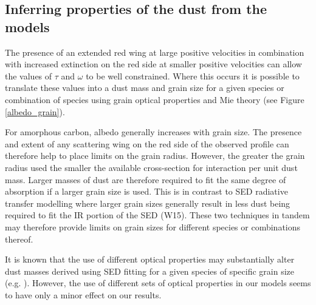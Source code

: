 \documentclass[useAMS,usenatbib,usegraphicx]{mnras}
\begin{document}
\subsection{Inferring properties of the dust from the models}





The presence of an extended red wing at large positive velocities in 
combination with increased extinction on the red side at smaller positive 
velocities can allow the values of $\tau$ and $\omega$ to be well 
constrained.  Where this occurs it is possible to translate these values into a 
dust mass and grain size for a given species or combination of 
species using grain optical properties and Mie theory (see Figure 
\ref{albedo_grain}).  


For amorphous carbon, albedo generally increases with grain size.  The presence and extent of any scattering wing on the red side of the observed profile can therefore help to place limits on the grain radius.  However, the greater the grain radius used the smaller the available cross-section for interaction per unit dust mass.  Larger masses of dust 
are therefore required to fit the same degree of absorption if a larger 
grain size is used.  This is in contrast to SED radiative transfer 
modelling where larger grain sizes generally result in less dust being 
required to fit the IR portion of the SED (W15).  These two techniques in 
tandem may therefore provide limits on grain sizes for different 
species or combinations thereof.

It is known that the use of different 
optical properties may substantially alter dust masses derived using SED fitting for a given species of specific grain size (e.g. \citet{Owen2015}).  However, the use of different sets of optical properties in our models seems to have only a minor effect on our results.
\end{document}
